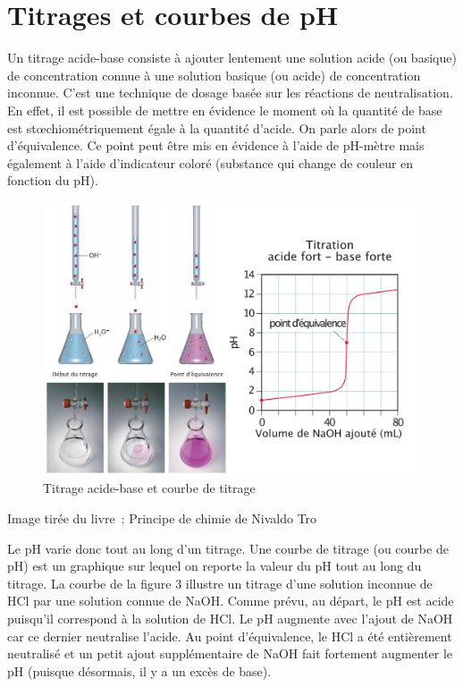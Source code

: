 \documentclass[
  11pt,
  a4paper,
  openany]{book}
\newenvironment{credit}
  {\vspace{-1em}\begin{center}\begin{footnotesize}\begin{textit}}
  {\end{textit}\end{footnotesize}\end{center}}
\begin{document}
\clearpage

\hypertarget{titrages-et-courbes-de-ph}{%
\section{Titrages et courbes de pH}\label{titrages-et-courbes-de-ph}}

Un titrage acide-base consiste à ajouter lentement une solution acide (ou basique) de concentration connue à une solution basique (ou acide) de concentration inconnue. C'est une technique de dosage basée sur les réactions de neutralisation. En effet, il est possible de mettre en évidence le moment où la quantité de base est stœchiométriquement égale à la quantité d'acide. On parle alors de point d'équivalence. Ce point peut être mis en évidence à l'aide de pH-mètre mais également à l'aide d'indicateur coloré (substance qui change de couleur en fonction du pH).

\begin{figure}

{\centering \includegraphics[width=1\linewidth]{images/acides-bases-5} 

}

\caption{Titrage acide-base et courbe de titrage}\label{fig:acides-bases-5}
\end{figure}

\begin{credit}
Image tirée du livre~: Principe de chimie de Nivaldo Tro

\end{credit}

Le pH varie donc tout au long d'un titrage. Une courbe de titrage (ou courbe de pH) est un graphique sur lequel on reporte la valeur du pH tout au long du titrage. La courbe de la figure 3 illustre un titrage d'une solution inconnue de HCl par une solution connue de NaOH. Comme prévu, au départ, le pH est acide puisqu'il correspond à la solution de HCl. Le pH augmente avec l'ajout de NaOH car ce dernier neutralise l'acide. Au point d'équivalence, le HCl a été entièrement neutralisé et un petit ajout supplémentaire de NaOH fait fortement augmenter le pH (puisque désormais, il y a un excès de base).
\end{document}

